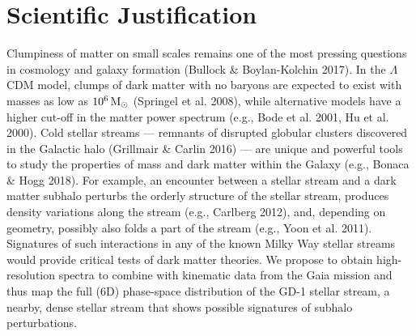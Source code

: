 \documentclass[12pt]{article}
\begin{document}
%
%
\section*{Scientific Justification}\vskip-0.2in


Clumpiness of matter on small scales remains one of the most pressing questions in cosmology and galaxy formation (Bullock \& Boylan-Kolchin 2017).
In the $\Lambda$CDM model, clumps of dark matter with no baryons are expected to exist with masses as low as $10^{6}\rm\,M_\odot$ (Springel et al. 2008), while alternative models have a higher cut-off in the matter power spectrum (e.g., Bode et al. 2001, Hu et al. 2000).
Cold stellar streams --- remnants of disrupted globular clusters discovered in the Galactic halo (Grillmair \& Carlin 2016) --- are unique and powerful tools to study the properties of mass and dark matter within the Galaxy (e.g., Bonaca \& Hogg 2018).
For example, an encounter between a stellar stream and a dark matter subhalo perturbs the orderly structure of the stellar stream, produces density variations along the stream (e.g., Carlberg 2012), and, depending on geometry, possibly also folds a part of the stream (e.g., Yoon et al. 2011).
Signatures of such interactions in any of the known Milky Way stellar streams would provide critical tests of dark matter theories.
We propose to obtain high-resolution spectra to combine with kinematic data from the Gaia mission and thus map the full (6D) phase-space distribution of the GD-1 stellar stream, a nearby, dense stellar stream that shows possible signatures of subhalo perturbations.
\end{document}
